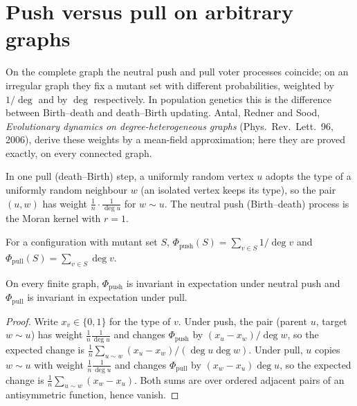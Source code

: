 \section{Push versus pull on arbitrary graphs}\label{sec:ars-push-pull}
On the complete graph the neutral push and pull voter processes coincide; on an irregular graph
they fix a mutant set with different probabilities, weighted by $1/\deg$ and by $\deg$
respectively. In population genetics this is the difference between Birth--death and
death--Birth updating. Antal, Redner and Sood, \emph{Evolutionary dynamics on
degree-heterogeneous graphs} (Phys.\ Rev.\ Lett.\ 96, 2006), derive these weights by a
mean-field approximation; here they are proved exactly, on every connected graph.
\begin{definition}\label{def:pull}
\leanok{}
In one pull (death--Birth) step, a uniformly random vertex $u$ adopts the type of a uniformly
random neighbour $w$ (an isolated vertex keeps its type), so the pair $(u,w)$ has weight
$\frac1n\cdot\frac1{\deg u}$ for $w\sim u$. The neutral push (Birth--death) process is the
Moran kernel with $r=1$.
\end{definition}
\begin{definition}\label{def:repro}
\leanok
For a configuration with mutant set $S$, $\Phi_{\mathrm{push}}(S)=\sum_{v\in S}1/\deg v$ and
$\Phi_{\mathrm{pull}}(S)=\sum_{v\in S}\deg v$.
\end{definition}
\begin{theorem}\label{thm:pushpull-invariance}
\leanok{}
On every finite graph, $\Phi_{\mathrm{push}}$ is invariant in expectation under neutral push and
$\Phi_{\mathrm{pull}}$ is invariant in expectation under pull.
\end{theorem}
\begin{proof}\leanok
Write $x_v\in\{0,1\}$ for the type of $v$. Under push, the pair (parent $u$, target $w\sim u$)
has weight $\frac1n\frac1{\deg u}$ and changes $\Phi_{\mathrm{push}}$ by $(x_u-x_w)/\deg w$, so
the expected change is $\frac1n\sum_{u\sim w}(x_u-x_w)/(\deg u\deg w)$. Under pull, $u$ copies
$w\sim u$ with weight $\frac1n\frac1{\deg u}$ and changes $\Phi_{\mathrm{pull}}$ by
$(x_w-x_u)\deg u$, so the expected change is $\frac1n\sum_{u\sim w}(x_w-x_u)$. Both sums are
over ordered adjacent pairs of an antisymmetric function, hence vanish.
\end{proof}

